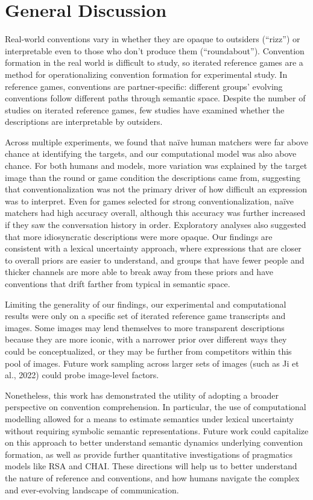 \documentclass[10pt, letterpaper]{article}
\begin{document}
\section{General Discussion}\label{general-discussion}

Real-world conventions vary in whether they are opaque to outsiders
(``rizz'') or interpretable even to those who don't produce them
(``roundabout''). Convention formation in the real world is difficult to
study, so iterated reference games are a method for operationalizing
convention formation for experimental study. In reference games,
conventions are partner-specific: different groups' evolving conventions
follow different paths through semantic space. Despite the number of
studies on iterated reference games, few studies have examined whether
the descriptions are interpretable by outsiders.

Across multiple experiments, we found that naïve human matchers were far
above chance at identifying the targets, and our computational model was
also above chance. For both humans and models, more variation was
explained by the target image than the round or game condition the
descriptions came from, suggesting that conventionalization was not the
primary driver of how difficult an expression was to interpret. Even for
games selected for strong conventionalization, naïve matchers had high
accuracy overall, although this accuracy was further increased if they
saw the conversation history in order. Exploratory analyses also
suggested that more idiosyncratic descriptions were more opaque. Our
findings are consistent with a lexical uncertainty approach, where
expressions that are closer to overall priors are easier to understand,
and groups that have fewer people and thicker channels are more able to
break away from these priors and have conventions that drift farther
from typical in semantic space.

Limiting the generality of our findings, our experimental and
computational results were only on a specific set of iterated reference
game transcripts and images. Some images may lend themselves to more
transparent descriptions because they are more iconic, with a narrower
prior over different ways they could be conceptualized, or they may be
further from competitors within this pool of images. Future work
sampling across larger sets of images (such as Ji et al., 2022) could
probe image-level factors.

Nonetheless, this work has demonstrated the utility of adopting a
broader perspective on convention comprehension. In particular, the use
of computational modelling allowed for a means to estimate semantics
under lexical uncertainty without requiring symbolic semantic
representations. Future work could capitalize on this approach to better
understand semantic dynamics underlying convention formation, as well as
provide further quantitative investigations of pragmatics models like
RSA and CHAI. These directions will help us to better understand the
nature of reference and conventions, and how humans navigate the complex
and ever-evolving landscape of communication.
\end{document}
